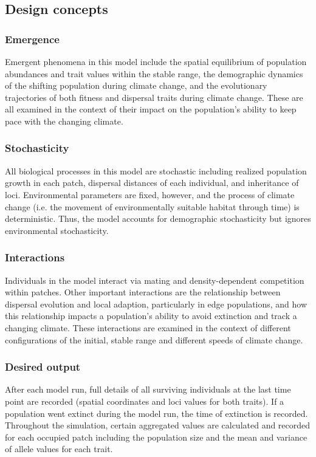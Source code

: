 \documentclass[11pt, oneside]{article}
\begin{document}
\subsection{Design concepts}
\subsubsection{Emergence}
Emergent phenomena in this model include the spatial equilibrium of population abundances and trait values within the stable range, the demographic dynamics of the shifting population during climate change, and the evolutionary trajectories of both fitness and dispersal traits during climate change. These are all examined in the context of their impact on the population's ability to keep pace with the changing climate.  

\subsubsection{Stochasticity}
All biological processes in this model are stochastic including realized population growth in each patch, dispersal distances of each individual, and inheritance of loci. Environmental parameters are fixed, however, and the process of climate change (i.e. the movement of environmentally suitable habitat through time) is deterministic. Thus, the model accounts for demographic stochasticity but ignores environmental stochasticity.

\subsubsection{Interactions}
Individuals in the model interact via mating and density-dependent competition within patches. Other important interactions are the relationship between dispersal evolution and local adaption, particularly in edge populations, and how this relationship impacts a population's ability to avoid extinction and track a changing climate. These interactions are examined in the context of different configurations of the initial, stable range and different speeds of climate change.

\subsubsection{Desired output}
After each model run, full details of all surviving individuals at the last time point are recorded (spatial coordinates and loci values for both traits). If a population went extinct during the model run, the time of extinction is recorded. Throughout the simulation, certain aggregated values are calculated and recorded for each occupied patch including the population size and the mean and variance of allele values for each trait. 
\end{document}
